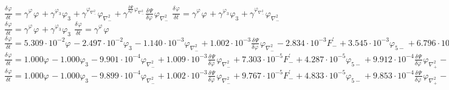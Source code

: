 $\frac{{\delta}^{} \varphi_{{}}}{{\delta} {t}^{}} = {\gamma}^{{{\varphi_{{}}}^{}}}{{\varphi_{{}}}^{}} + {\gamma}^{{{\varphi_{3{}}}^{}}}{{\varphi_{3{}}}^{}} + {\gamma}^{{{{\varphi}_{\scriptscriptstyle{\nabla^2_{-}}}}^{}}}{{{\varphi}_{\scriptscriptstyle{\nabla^2_{-}}}}^{}} + {\gamma}^{{{\frac{{\delta}^{} \Psi}{{\delta} {\varphi_{{}}}^{}}}^{}{{\varphi}_{\scriptscriptstyle{\nabla^2_{-}}}}^{}}}{{\frac{{\delta}^{} \Psi}{{\delta} {\varphi_{{}}}^{}}}^{}{{\varphi}_{\scriptscriptstyle{\nabla^2_{-}}}}^{}}$
$\frac{{\delta}^{} \varphi_{{}}}{{\delta} {t}^{}} = {\gamma}^{{{\varphi_{{}}}^{}}}{{\varphi_{{}}}^{}} + {\gamma}^{{{\varphi_{3{}}}^{}}}{{\varphi_{3{}}}^{}} + {\gamma}^{{{{\varphi}_{\scriptscriptstyle{\nabla^2_{-}}}}^{}}}{{{\varphi}_{\scriptscriptstyle{\nabla^2_{-}}}}^{}}$
$\frac{{\delta}^{} \varphi_{{}}}{{\delta} {t}^{}} = {\gamma}^{{{\varphi_{{}}}^{}}}{{\varphi_{{}}}^{}} + {\gamma}^{{{\varphi_{3{}}}^{}}}{{\varphi_{3{}}}^{}}$
$\frac{{\delta}^{} \varphi_{{}}}{{\delta} {t}^{}} = {\gamma}^{{{\varphi_{{}}}^{}}}{{\varphi_{{}}}^{}}$
$\frac{{\delta}^{} \varphi_{{}}}{{\delta} {t}^{}} = 5.309\cdot 10^{-2}{{\varphi_{{}}}^{}} - 2.497\cdot 10^{-2}{{\varphi_{3{}}}^{}} - 1.140\cdot 10^{-3}{{{\varphi}_{\scriptscriptstyle{\nabla^2_{-}}}}^{}} + 1.002\cdot 10^{-3}{{\frac{{\delta}^{} \Psi}{{\delta} {\varphi_{{}}}^{}}}^{}{{\varphi}_{\scriptscriptstyle{\nabla^2_{-}}}}^{}} - 2.834\cdot 10^{-3}{{{{F}^{\prime}_{-}}}^{}} + 3.545\cdot 10^{-3}{{{\varphi}_{5{-}}}^{}} + 6.796\cdot 10^{-4}{{\frac{{\delta}^{} \Psi}{{\delta} {\varphi_{{}}}^{}}}^{}{\varphi_{\scriptscriptstyle{\nabla^2_{+}}}}^{}} + 1.533\cdot 10^{-3}{{\frac{{\delta}^{} \Psi}{{\delta} {\varphi_{{}}}^{}}}^{}{{\varphi}_{4{-}}}^{}} - 3.924\cdot 10^{-3}{{\frac{{\delta}^{} \Psi}{{\delta} {\varphi_{{}}}^{}}}^{}{{F_{+}}}^{}} + 1.128\cdot 10^{-4}{{\varphi_{5{}}}^{}}$
$\frac{{\delta}^{} \varphi_{{}}}{{\delta} {t}^{}} = 1.000{{\varphi_{{}}}^{}} - 1.000{{\varphi_{3{}}}^{}} - 9.901\cdot 10^{-4}{{{\varphi}_{\scriptscriptstyle{\nabla^2_{-}}}}^{}} + 1.009\cdot 10^{-3}{{\frac{{\delta}^{} \Psi}{{\delta} {\varphi_{{}}}^{}}}^{}{{\varphi}_{\scriptscriptstyle{\nabla^2_{-}}}}^{}} + 7.303\cdot 10^{-5}{{{{F}^{\prime}_{-}}}^{}} + 4.287\cdot 10^{-5}{{{\varphi}_{5{-}}}^{}} + 9.912\cdot 10^{-4}{{\frac{{\delta}^{} \Psi}{{\delta} {\varphi_{{}}}^{}}}^{}{\varphi_{\scriptscriptstyle{\nabla^2_{+}}}}^{}} - 1.279\cdot 10^{-4}{{\frac{{\delta}^{} \Psi}{{\delta} {\varphi_{{}}}^{}}}^{}{{\varphi}_{4{-}}}^{}} - 7.248\cdot 10^{-5}{{\frac{{\delta}^{} \Psi}{{\delta} {\varphi_{{}}}^{}}}^{}{{F_{+}}}^{}}$
$\frac{{\delta}^{} \varphi_{{}}}{{\delta} {t}^{}} = 1.000{{\varphi_{{}}}^{}} - 1.000{{\varphi_{3{}}}^{}} - 9.899\cdot 10^{-4}{{{\varphi}_{\scriptscriptstyle{\nabla^2_{-}}}}^{}} + 1.002\cdot 10^{-3}{{\frac{{\delta}^{} \Psi}{{\delta} {\varphi_{{}}}^{}}}^{}{{\varphi}_{\scriptscriptstyle{\nabla^2_{-}}}}^{}} + 9.767\cdot 10^{-5}{{{{F}^{\prime}_{-}}}^{}} + 4.833\cdot 10^{-5}{{{\varphi}_{5{-}}}^{}} + 9.853\cdot 10^{-4}{{\frac{{\delta}^{} \Psi}{{\delta} {\varphi_{{}}}^{}}}^{}{\varphi_{\scriptscriptstyle{\nabla^2_{+}}}}^{}} - 1.098\cdot 10^{-4}{{\frac{{\delta}^{} \Psi}{{\delta} {\varphi_{{}}}^{}}}^{}{{\varphi}_{4{-}}}^{}}$

